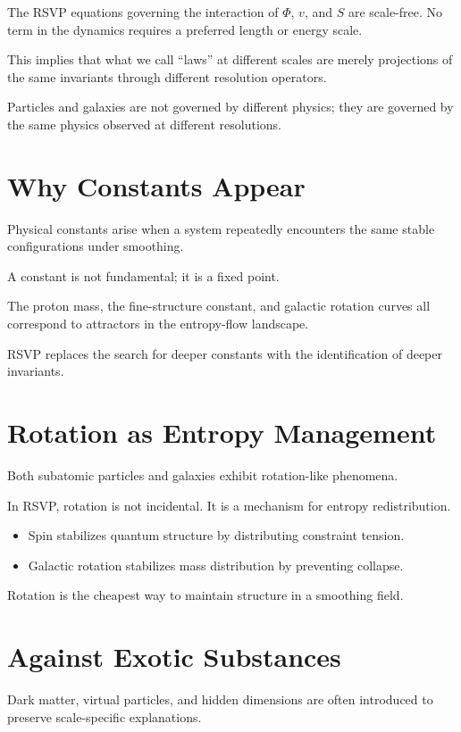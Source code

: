 \documentclass[11pt]{book}
\begin{document}
The RSVP equations governing the interaction of \(\Phi\), \(v\), and \(S\) are scale-free. No term in the dynamics requires a preferred length or energy scale.

This implies that what we call “laws” at different scales are merely projections of the same invariants through different resolution operators.

Particles and galaxies are not governed by different physics; they are governed by the same physics observed at different resolutions.

\section{Why Constants Appear}

Physical constants arise when a system repeatedly encounters the same stable configurations under smoothing.

A constant is not fundamental; it is a fixed point.

The proton mass, the fine-structure constant, and galactic rotation curves all correspond to attractors in the entropy-flow landscape.

RSVP replaces the search for deeper constants with the identification of deeper invariants.

\section{Rotation as Entropy Management}

Both subatomic particles and galaxies exhibit rotation-like phenomena.

In RSVP, rotation is not incidental. It is a mechanism for entropy redistribution.

\begin{itemize}
\item Spin stabilizes quantum structure by distributing constraint tension.
\item Galactic rotation stabilizes mass distribution by preventing collapse.
\end{itemize}

Rotation is the cheapest way to maintain structure in a smoothing field.

\section{Against Exotic Substances}

Dark matter, virtual particles, and hidden dimensions are often introduced to preserve scale-specific explanations.
\end{document}
